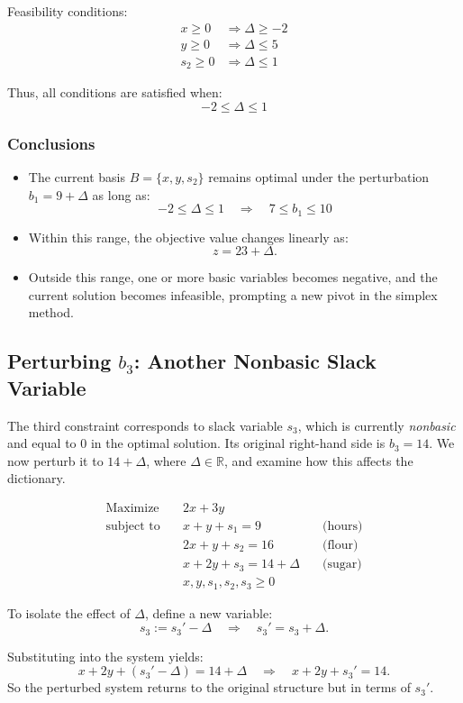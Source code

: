 Feasibility conditions:
\[
\begin{aligned}
x \geq 0 &\Rightarrow \Delta \geq -2 \\
y \geq 0 &\Rightarrow \Delta \leq 5 \\
s_2 \geq 0 &\Rightarrow \Delta \leq 1
\end{aligned}
\]

Thus, all conditions are satisfied when:
\[
\boxed{-2 \leq \Delta \leq 1}
\]

\subsubsection*{Conclusions}
\begin{itemize}
\item The current basis \( B = \{x, y, s_2\} \) remains optimal under the perturbation \( b_1 = 9 + \Delta \) as long as:
\[
\boxed{-2 \leq \Delta \leq 1} \quad \Rightarrow \quad \boxed{7 \leq b_1 \leq 10}
\]
\item Within this range, the objective value changes linearly as:
\[
z = 23 + \Delta.
\]
\item Outside this range, one or more basic variables becomes negative, and the current solution becomes infeasible, prompting a new pivot in the simplex method.
\end{itemize}


\subsection{Perturbing \( b_3 \): Another Nonbasic Slack Variable}

The third constraint corresponds to slack variable \( s_3 \), which is currently \emph{nonbasic} and equal to 0 in the optimal solution. Its original right-hand side is \( b_3 = 14 \). We now perturb it to \( 14 + \Delta \), where \( \Delta \in \mathbb{R} \), and examine how this affects the dictionary.

\begin{tcolorbox}[colback=gray!5!white, colframe=pink!75!black,    
    width=0.9\textwidth,
    box align=center, 
    title=\textbf{Perturbed Standard Form (RHS of Constraint 3)}]
\[
\begin{aligned}
\text{Maximize} \quad & 2x + 3y \\
\text{subject to} \quad 
& x + y + s_1 = 9 \quad & \text{(hours)} \\
& 2x + y + s_2 = 16 \quad & \text{(flour)} \\
& x + 2y + s_3 = 14 + \Delta \quad & \text{(sugar)} \\
& x, y, s_1, s_2, s_3 \geq 0
\end{aligned}
\]

To isolate the effect of \( \Delta \), define a new variable:
\[
s_3 := s_3' - \Delta \quad \Rightarrow \quad s_3' = s_3 + \Delta.
\]

Substituting into the system yields:
\[
x + 2y + (s_3' - \Delta) = 14 + \Delta \quad \Rightarrow \quad x + 2y + s_3' = 14.
\]
So the perturbed system returns to the original structure but in terms of \( s_3' \).
\end{tcolorbox}

